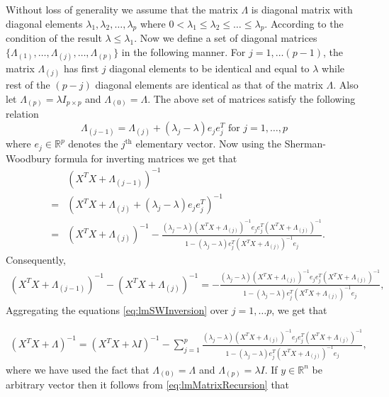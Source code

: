 \documentclass[noinfoline,11pt]{imsart}
\numberwithin{equation}{section}
\theoremstyle{plain}
\newcommand{\lmLambda}{\Lambda}
\newcommand{\lmlambda}{\lambda}
\newcommand{\lmX}{X}
\newcommand{\lmy}{y}
\newcommand{\R}{\mathbb{R}}
\newcommand{\lme}{e}
\begin{document}
\proof
Without loss of generality we assume that the matrix $\lmLambda$ is diagonal matrix with diagonal elements $\lmlambda_1, \lmlambda_2, \ldots, \lmlambda_p $ where $0<\lmlambda_1\leq \lmlambda_2\leq  \ldots \leq  \lmlambda_p. $ According to the condition of the  result $\lmlambda\leq \lmlambda_1$. Now we define a set of diagonal matrices $\{\lmLambda_{(1)}, \ldots, \lmLambda_{(j)} , \ldots, \lmLambda_{(p)} \}$ in the following manner. For $j=1, \ldots (p-1)$, the matrix $\lmLambda_{(j)} $ has first $j$ diagonal elements to be identical and equal to $\lmlambda$ while rest of the $(p-j)$ diagonal elements are identical as that of the matrix $\lmLambda$. Also let  $\lmLambda_{(p)}=\lmlambda I_{p\times p} $ and  $\lmLambda_{(0)}=\lmLambda$. The above set of matrices satisfy the following relation
$$ \lmLambda_{(j-1)}=\lmLambda_{(j)}+ (\lmlambda_j-\lmlambda) \lme_j\lme_j^T  \text{ for } j=1 , \ldots, p $$
where $\lme_j\in\R^p$ denotes the $j^{\text{th}}$ elementary vector.  Now using the Sherman-Woodbury formula for inverting matrices we get that 
\begin{eqnarray}
& & \left( \lmX^T\lmX+\lmLambda_{(j-1)} \right)^{-1} \nonumber\\
& = &  \left( \lmX^T\lmX+\lmLambda_{(j)}+  (\lmlambda_j-\lmlambda) \lme_j\lme_j^T  \right)^{-1} \nonumber\\
& = &  \left( \lmX^T\lmX+\lmLambda_{(j)}\right)^{-1}- \frac{(\lmlambda_j-\lmlambda)   \left( \lmX^T\lmX+\lmLambda_{(j)}\right)^{-1} \lme_j\lme_j^T \left( \lmX^T\lmX+\lmLambda_{(j)}\right)^{-1}   }{ 1- (\lmlambda_j-\lmlambda) \lme_j^T \left( \lmX^T\lmX+\lmLambda_{(j)}\right)^{-1} \lme_j    } .\nonumber
\end{eqnarray}
Consequently, 
\begin{eqnarray}\label{eq:lmSWInversion}
\left( \lmX^T\lmX+\lmLambda_{(j-1)} \right)^{-1}-  \left( \lmX^T\lmX+\lmLambda_{(j)}\right)^{-1} = - \frac{(\lmlambda_j-\lmlambda)   \left( \lmX^T\lmX+\lmLambda_{(j)}\right)^{-1} \lme_j\lme_j^T \left( \lmX^T\lmX+\lmLambda_{(j)}\right)^{-1}   }{ 1- (\lmlambda_j-\lmlambda) \lme_j^T \left( \lmX^T\lmX+\lmLambda_{(j)}\right)^{-1} \lme_j    },
\end{eqnarray}
Aggregating the equations \ref{eq:lmSWInversion}  over $j=1, \ldots p$,   we get that  

\begin{eqnarray}\label{eq:lmMatrixRecursion}
\left( \lmX^T\lmX+\lmLambda \right)^{-1}= \left( \lmX^T\lmX+\lmlambda I\right)^{-1}  - \sum_{j=1}^{p}\frac{(\lmlambda_j-\lmlambda)   \left( \lmX^T\lmX+\lmLambda_{(j)}\right)^{-1} \lme_j\lme_j^T \left( \lmX^T\lmX+\lmLambda_{(j)}\right)^{-1}   }{ 1- (\lmlambda_j-\lmlambda) \lme_j^T \left( \lmX^T\lmX+\lmLambda_{(j)}\right)^{-1} \lme_j    },
\end{eqnarray}
where we have used the fact that  $\lmLambda_{(0)}=\lmLambda$ and $\lmLambda_{(p)}=\lmlambda I $. If $\lmy\in \R^n$ be arbitrary vector then  it follows from \ref{eq:lmMatrixRecursion} that 
\end{document}
